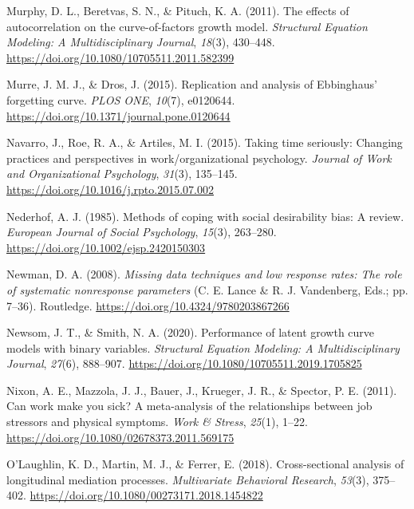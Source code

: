 \documentclass[
  english,
  man,floatsintext]{apa7}
\newlength{\cslhangindent}
\newlength{\cslentryspacingunit} %
\newenvironment{CSLReferences}[2] %
 {%
  \setlength{\parindent}{0pt}
  \ifodd #1
  \let\oldpar\par
  \def\par{\hangindent=\cslhangindent\oldpar}
  \fi
  \setlength{\parskip}{#2\cslentryspacingunit}
 }%
 {}
\begin{document}
\begin{CSLReferences}{1}{0}
\leavevmode{}%
Murphy, D. L., Beretvas, S. N., \& Pituch, K. A. (2011). The effects of autocorrelation on the curve-of-factors growth model. \emph{Structural Equation Modeling: A Multidisciplinary Journal}, \emph{18}(3), 430--448. \url{https://doi.org/10.1080/10705511.2011.582399}

\leavevmode{}%
Murre, J. M. J., \& Dros, J. (2015). Replication and analysis of Ebbinghaus{'} forgetting curve. \emph{PLOS ONE}, \emph{10}(7), e0120644. \url{https://doi.org/10.1371/journal.pone.0120644}

\leavevmode{}%
Navarro, J., Roe, R. A., \& Artiles, M. I. (2015). Taking time seriously: Changing practices and perspectives in work/organizational psychology. \emph{Journal of Work and Organizational Psychology}, \emph{31}(3), 135--145. \url{https://doi.org/10.1016/j.rpto.2015.07.002}

\leavevmode{}%
Nederhof, A. J. (1985). Methods of coping with social desirability bias: A review. \emph{European Journal of Social Psychology}, \emph{15}(3), 263--280. \url{https://doi.org/10.1002/ejsp.2420150303}

\leavevmode{}%
Newman, D. A. (2008). \emph{Missing data techniques and low response rates: The role of systematic nonresponse parameters} (C. E. Lance \& R. J. Vandenberg, Eds.; pp. 7--36). Routledge. \url{https://doi.org/10.4324/9780203867266}

\leavevmode{}%
Newsom, J. T., \& Smith, N. A. (2020). Performance of latent growth curve models with binary variables. \emph{Structural Equation Modeling: A Multidisciplinary Journal}, \emph{27}(6), 888--907. \url{https://doi.org/10.1080/10705511.2019.1705825}

\leavevmode{}%
Nixon, A. E., Mazzola, J. J., Bauer, J., Krueger, J. R., \& Spector, P. E. (2011). Can work make you sick? A meta-analysis of the relationships between job stressors and physical symptoms. \emph{Work \& Stress}, \emph{25}(1), 1--22. \url{https://doi.org/10.1080/02678373.2011.569175}

\leavevmode{}%
O'Laughlin, K. D., Martin, M. J., \& Ferrer, E. (2018). Cross-sectional analysis of longitudinal mediation processes. \emph{Multivariate Behavioral Research}, \emph{53}(3), 375--402. \url{https://doi.org/10.1080/00273171.2018.1454822}


\end{CSLReferences}
\end{document}
